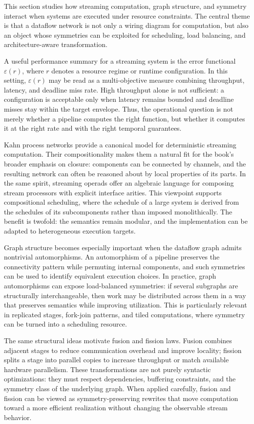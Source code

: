 This section studies how streaming computation, graph structure, and symmetry interact when systems are executed under resource constraints. The central theme is that a dataflow network is not only a wiring diagram for computation, but also an object whose symmetries can be exploited for scheduling, load balancing, and architecture-aware transformation.

A useful performance summary for a streaming system is the error functional \(\varepsilon(r)\), where \(r\) denotes a resource regime or runtime configuration. In this setting, \(\varepsilon(r)\) may be read as a multi-objective measure combining throughput, latency, and deadline miss rate. High throughput alone is not sufficient: a configuration is acceptable only when latency remains bounded and deadline misses stay within the target envelope. Thus, the operational question is not merely whether a pipeline computes the right function, but whether it computes it at the right rate and with the right temporal guarantees.

Kahn process networks provide a canonical model for deterministic streaming computation. Their compositionality makes them a natural fit for the book's broader emphasis on closure: components can be connected by channels, and the resulting network can often be reasoned about by local properties of its parts. In the same spirit, streaming operads offer an algebraic language for composing stream processors with explicit interface arities. This viewpoint supports compositional scheduling, where the schedule of a large system is derived from the schedules of its subcomponents rather than imposed monolithically. The benefit is twofold: the semantics remain modular, and the implementation can be adapted to heterogeneous execution targets.

Graph structure becomes especially important when the dataflow graph admits nontrivial automorphisms. An automorphism of a pipeline preserves the connectivity pattern while permuting internal components, and such symmetries can be used to identify equivalent execution choices. In practice, graph automorphisms can expose load-balanced symmetries: if several subgraphs are structurally interchangeable, then work may be distributed across them in a way that preserves semantics while improving utilization. This is particularly relevant in replicated stages, fork-join patterns, and tiled computations, where symmetry can be turned into a scheduling resource.

The same structural ideas motivate fusion and fission laws. Fusion combines adjacent stages to reduce communication overhead and improve locality; fission splits a stage into parallel copies to increase throughput or match available hardware parallelism. These transformations are not purely syntactic optimizations: they must respect dependencies, buffering constraints, and the symmetry class of the underlying graph. When applied carefully, fusion and fission can be viewed as symmetry-preserving rewrites that move computation toward a more efficient realization without changing the observable stream behavior.

